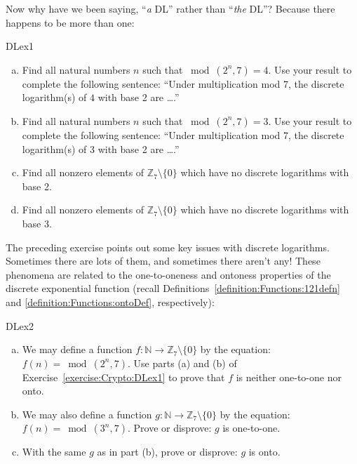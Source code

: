  Now why have we been saying, ``\emph{a} DL'' rather than ``\emph{the} DL''? Because  there happens to be more than one:

\begin{exercise}{DLex1}
\begin{enumerate}[(a)]
\item
Find all natural numbers $n$ such that $\bmod(2^n,7)=4$.  Use your result to complete the following sentence: ``Under multiplication mod 7, the discrete logarithm(s) of $4$ with base 2  are \ldots.''
\item
Find all natural numbers $n$ such that $\bmod(2^n,7)=3$.  Use your result to complete the following sentence:  ``Under multiplication mod 7, the discrete logarithm(s) of $3$ with base 2 are \ldots.''
\item
Find all nonzero elements of $\mathbb{Z}_7 \setminus \{0\}$ which have no discrete logarithms with base 2.
\item
Find all nonzero elements of $\mathbb{Z}_7 \setminus \{0\}$ which have no discrete logarithms with base 3.
\end{enumerate}
\end{exercise}

The preceding exercise points out some key issues with discrete logarithms. Sometimes there are lots of them, and sometimes there aren't any! These phenomena are related to the one-to-oneness and ontoness properties of  the discrete exponential function (recall Definitions~\ref{definition:Functions:121defn} and \ref{definition:Functions:ontoDef}, respectively):

\begin{exercise}{DLex2}
\begin{enumerate}[(a)]
\item
We may define a function $f: \mathbb{N} \rightarrow \mathbb{Z}_7 \setminus \{0\}$ by the equation: $f(n) = \bmod(2^n,7)$. 
Use parts (a) and (b) of Exercise~\ref{exercise:Crypto:DLex1} to prove that $f$ is neither one-to-one nor onto.
\item
We may also define a function $g: \mathbb{N} \rightarrow \mathbb{Z}_7 \setminus \{0\}$ by the equation: $f(n) = \bmod(3^n,7)$. 
Prove or disprove: $g$ is one-to-one.
\item
With the same $g$ as in part (b), prove or disprove: $g$ is onto.
\end{enumerate}
\end{exercise}

